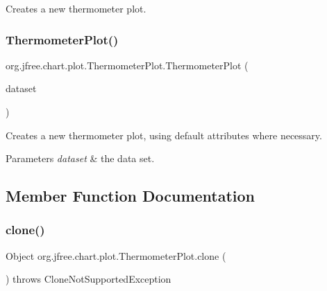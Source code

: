 Creates a new thermometer plot. \mbox{\label{classorg_1_1jfree_1_1chart_1_1plot_1_1_thermometer_plot_acc3f72c3360ed372a868d50cbc30e3ce}} 
\subsubsection{\texorpdfstring{Thermometer\+Plot()}{ThermometerPlot()}\hspace{0.1cm}{\footnotesize\ttfamily [2/2]}}
{\footnotesize\ttfamily org.\+jfree.\+chart.\+plot.\+Thermometer\+Plot.\+Thermometer\+Plot (\begin{DoxyParamCaption}\item[{\mbox{\hyperlink{interfaceorg_1_1jfree_1_1data_1_1general_1_1_value_dataset}{Value\+Dataset}}}]{dataset }\end{DoxyParamCaption})}

Creates a new thermometer plot, using default attributes where necessary.


\begin{DoxyParams}{Parameters}
{\em dataset} & the data set. \\
\hline
\end{DoxyParams}


\subsection{Member Function Documentation}
\mbox{\label{classorg_1_1jfree_1_1chart_1_1plot_1_1_thermometer_plot_a778b1859c334f6e1d630fb6fb5380535}} 
\subsubsection{\texorpdfstring{clone()}{clone()}}
{\footnotesize\ttfamily Object org.\+jfree.\+chart.\+plot.\+Thermometer\+Plot.\+clone (\begin{DoxyParamCaption}{ }\end{DoxyParamCaption}) throws Clone\+Not\+Supported\+Exception}

